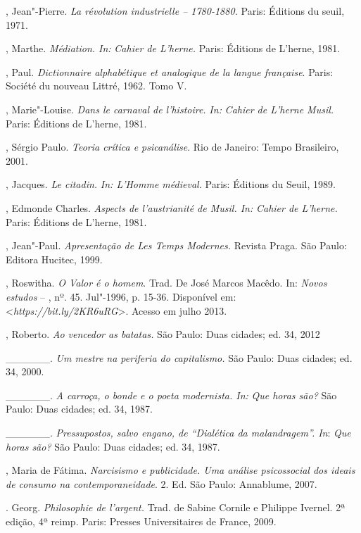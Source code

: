 \begin{Parskip}
, Jean"-Pierre. \emph{La révolution industrielle -- 1780-1880.}
Paris: Éditions du seuil, 1971.

, Marthe. \emph{Médiation. In:} \emph{Cahier de L'herne.} Paris:
Éditions de L'herne, 1981.

, Paul. \emph{Dictionnaire alphabétique et analogique de la
langue française}. Paris: Société du nouveau Littré, 1962. Tomo V.

, Marie"-Louise. \emph{Dans le carnaval de l'histoire.} \emph{In:}
\emph{Cahier de L'herne Musil.} Paris: Éditions de L'herne, 1981.

, Sérgio Paulo. \emph{Teoria crítica e psicanálise}. Rio de
Janeiro: Tempo Brasileiro, 2001.

, Jacques. \emph{Le citadin.} \emph{In: L'Homme médieval.}
Paris: Éditions du Seuil, 1989.

, Edmonde Charles. \emph{Aspects de l'austrianité de Musil. In:}
\emph{Cahier de L'herne.} Paris: Éditions de L'herne, 1981.

, Jean"-Paul. \emph{Apresentação de Les Temps Modernes.} Revista
Praga. São Paulo: Editora Hucitec, 1999.

, Roswitha. \emph{O Valor é o homem}. Trad. De José Marcos
Macêdo. In: \emph{Novos} \emph{estudos} -- , nº. 45. Jul"-1996, p.
15-36. Disponível em: \textless{}\emph{https://bit.ly/2KR6uRG}\textgreater{}. Acesso em julho 2013.

, Roberto. \emph{Ao vencedor as batatas.} São Paulo: Duas
cidades; ed. 34, 2012

\_\_\_\_\_\_. \emph{Um mestre na periferia do capitalismo.} São Paulo:
Duas cidades; ed. 34, 2000.

\_\_\_\_\_\_. \emph{A carroça, o bonde e o poeta modernista. In:}
\emph{Que horas são?} São Paulo: Duas cidades; ed. 34, 1987.

\_\_\_\_\_\_. \emph{Pressupostos, salvo engano, de ``Dialética da
malandragem''. In}: \emph{Que horas são?} São Paulo: Duas cidades; ed.
34, 1987.

, Maria de Fátima. \emph{Narcisismo e publicidade. Uma
análise psicossocial dos ideais de consumo na contemporaneidade}. 2. Ed.
São Paulo: Annablume, 2007.

. Georg. \emph{Philosophie de l'argent.} Trad. de Sabine Cornile
e Philippe Ivernel. 2ª edição, 4ª reimp. Paris: Presses Universitaires
de France, 2009.


\end{Parskip}
